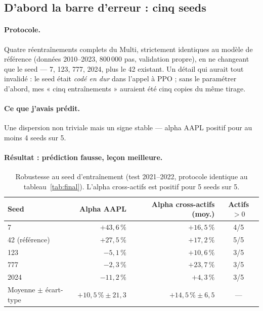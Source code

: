 \documentclass[11pt,a4paper]{article}
\newcommand{\ok}[1]{\textcolor{okgreen}{#1}}
\begin{document}
\subsection{D'abord la barre d'erreur : cinq seeds}
\label{sec:seeds}

\paragraph{Protocole.} Quatre réentraînements complets du Multi, strictement identiques
au modèle de référence (données 2010--2023, 800\,000 pas, validation propre), en ne
changeant que le seed --- 7, 123, 777, 2024, plus le 42 existant. Un détail qui aurait
tout invalidé : le seed était \emph{codé en dur} dans l'appel à PPO ; sans le
paramétrer d'abord, mes « cinq entraînements » auraient été cinq copies du même tirage.

\paragraph{Ce que j'avais prédit.} Une dispersion non triviale mais un signe stable ---
alpha AAPL positif pour au moins 4 seeds sur 5.

\paragraph{Résultat : prédiction fausse, leçon meilleure.}

\begin{table}[H]
\centering\small
\begin{tabular}{@{}lrrc@{}}
\toprule
\textbf{Seed} & \textbf{Alpha AAPL} & \textbf{Alpha cross-actifs (moy.)} & \textbf{Actifs $>0$} \\
\midrule
7    & $+43{,}6\,\%$ & $+16{,}5\,\%$ & 4/5 \\
42 (référence) & $+27{,}5\,\%$ & $+17{,}2\,\%$ & 5/5 \\
123  & $-5{,}1\,\%$  & $+10{,}6\,\%$ & 3/5 \\
777  & $-2{,}3\,\%$  & $+23{,}7\,\%$ & 3/5 \\
2024 & $-11{,}2\,\%$ & $+4{,}3\,\%$  & 3/5 \\
\midrule
Moyenne $\pm$ écart-type & $+10{,}5\,\% \pm 21{,}3$ & \ok{$+14{,}5\,\% \pm 6{,}5$} & --- \\
\bottomrule
\end{tabular}
\caption{Robustesse au seed d'entraînement (test 2021--2022, protocole identique au
tableau~\ref{tab:final}). L'alpha cross-actifs est positif pour \ok{5 seeds sur 5}.}
\label{tab:seeds}
\end{table}
\end{document}
